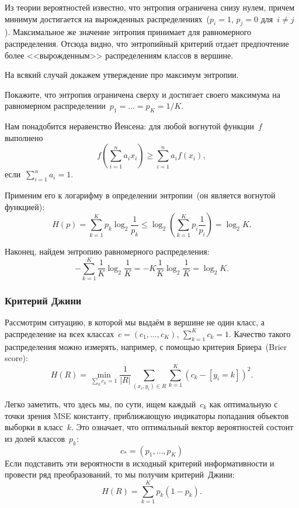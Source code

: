 \documentclass[12pt,a4paper]{article}
\begin{document}
Из теории вероятностей известно, что энтропия ограничена снизу нулем, причем минимум достигается на вырожденных
распределениях~($p_i = 1$, $p_j = 0$ для~$i \neq j$).
Максимальное же значение энтропия принимает для равномерного распределения.
Отсюда видно, что энтропийный критерий отдает предпочтение более <<вырожденным>> распределениям классов
в вершине.

На всякий случай докажем утверждение про максимум энтропии.

\begin{vkProblem}
    Покажите, что энтропия ограничена сверху и достигает своего максимума на
    равномерном распределении~$p_1 = \dots = p_K = 1/K$.
\end{vkProblem}

\begin{esSolution}
    Нам понадобится неравенство Йенсена: для любой вогнутой функции~$f$
    выполнено
    \[
        f\left(\sum_{i = 1}^{n} a_i x_i\right) \geq \sum_{i = 1}^{n} a_i f(x_i),
    \]
    если~$\sum_{i = 1}^{n} a_i = 1$.
    
    Применим его к логарифму в определении энтропии~(он является вогнутой функцией):
    \[
        H(p) = \sum_{k = 1}^{K} p_k \log_2 \frac{1}{p_k}
        \leq
        \log_2 \left( \sum_{k = 1}^{K} p_i \frac{1}{p_i} \right)
        =
        \log_2 K.
    \]
    
    Наконец, найдем энтропию равномерного распределения:
    \[
        -\sum_{k = 1}^{K} \frac{1}{K} \log_2 \frac{1}{K}
        =
        - K \frac{1}{K} \log_2 \frac{1}{K}
        =
        \log_2 K.
    \]        
\end{esSolution}

\subsubsection{Критерий Джини}
Рассмотрим ситуацию, в которой мы выдаём в вершине не один класс,
а распределение на всех классах~$c = (c_1, \dots, c_K)$, $\sum_{k = 1}^{K} c_k = 1$.
Качество такого распределения можно измерять, например, с помощью критерия Бриера~(Brier score):
\[
    H(R)
    =
    \min_{\sum_k c_k = 1}
    \frac{1}{|R|}
    \sum_{(x_i, y_i) \in R}
    \sum_{k = 1}^{K}
        (c_k - [y_i = k])^2.
\]

Легко заметить, что здесь мы, по сути, ищем каждый~$c_k$ как оптимальную с точки зрения MSE константу,
приближающую индикаторы попадания объектов выборки в класс~$k$.
Это означает, что оптимальный вектор вероятностей состоит из долей классов~$p_k$:
\[
    c_* = (p_1, \dots, p_K)
\]
Если подставить эти вероятности в исходный критерий информативности
и провести ряд преобразований, то мы получим критерий~Джини:
\[
    H(R)
    =
    \sum_{k = 1}^{K}
        p_k (1 - p_k).
\]
\end{document}
